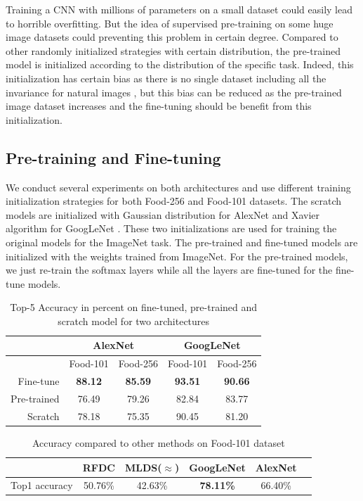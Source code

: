 ﻿Training a CNN with millions of parameters on a small dataset could easily lead to horrible overfitting. But the idea of supervised pre-training on some huge image datasets could preventing this problem in certain degree. Compared to other randomly initialized strategies with certain distribution, the pre-trained model is initialized according to the distribution of the specific task. Indeed, this initialization has certain bias as there is no single dataset including all the invariance for natural images \cite{agrawal2014analyzing}, but this bias can be reduced as the pre-trained image dataset increases and the fine-tuning should be benefit from this initialization.
\subsection{Pre-training and Fine-tuning}
We conduct several experiments on both architectures and use different training initialization strategies for both Food-256 and Food-101 datasets. The scratch models are initialized with Gaussian distribution for AlexNet and Xavier algorithm for GoogLeNet%
 \cite{glorot2010understanding}. These two initializations are used for training the original models for the ImageNet task. The pre-trained and fine-tuned models are initialized with the weights trained from ImageNet. For the pre-trained models, we just re-train the softmax layers while all the layers are fine-tuned for the fine-tune models.
\begin{table}[htbp]
  \centering
  \caption{Top-5 Accuracy in percent on fine-tuned, pre-trained and scratch model for two architectures}
    \begin{tabular}{r|cc|cc}
    \toprule
          & \multicolumn{2}{c|}{AlexNet} & \multicolumn{2}{c}{GoogLeNet} \\    \midrule
     & Food-101   & Food-256   & Food-101   & Food-256 \\
    Fine-tune & \textbf{88.12} & \textbf{85.59} & \textbf{93.51} & \textbf{90.66} \\
    Pre-trained &76.49	&79.26&	82.84	&83.77\\
    Scratch & 78.18 & 75.35 & 90.45 & 81.20 \\
    \bottomrule
    \end{tabular}%
  \label{tab:ft}%
\end{table}%

\begin{table}[htbp]
  \centering
  \caption{Accuracy compared to other methods on Food-101 dataset}
    \begin{tabular}{c|ccccc}
    \toprule
          & RFDC\cite{bossard14} & MLDS($\approx$\cite{singh2012unsupervised}) & GoogLeNet & AlexNet \\
    \midrule
    Top1 accuracy & 50.76\% & 42.63\%& \textbf{78.11\% }& 66.40\% \\
    \bottomrule
    \end{tabular}%
    \label{tab:pre}
\end{table}%



